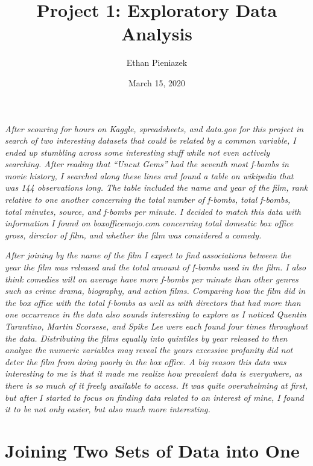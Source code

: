 \documentclass[]{article}
\title{Project 1: Exploratory Data Analysis}
\author{Ethan Pieniazek}
\date{March 15, 2020}
\begin{document}
\maketitle

\emph{After scouring for hours on Kaggle, spreadsheets, and data.gov for
this project in search of two interesting datasets that could be related
by a common variable, I ended up stumbling across some interesting stuff
while not even actively searching. After reading that ``Uncut Gems'' had
the seventh most f-bombs in movie history, I searched along these lines
and found a table on wikipedia that was 144 observations long. The table
included the name and year of the film, rank relative to one another
concerning the total number of f-bombs, total f-bombs, total minutes,
source, and f-bombs per minute. I decided to match this data with
information I found on boxofficemojo.com concerning total domestic box
office gross, director of film, and whether the film was considered a
comedy.}

\emph{After joining by the name of the film I expect to find
associations between the year the film was released and the total amount
of f-bombs used in the film. I also think comedies will on average have
more f-bombs per minute than other genres such as crime drama,
biography, and action films. Comparing how the film did in the box
office with the total f-bombs as well as with directors that had more
than one occurrence in the data also sounds interesting to explore as I
noticed Quentin Tarantino, Martin Scorsese, and Spike Lee were each
found four times throughout the data. Distributing the films equally
into quintiles by year released to then analyze the numeric variables
may reveal the years excessive profanity did not deter the film from
doing poorly in the box office. A big reason this data was interesting
to me is that it made me realize how prevalent data is everywhere, as
there is so much of it freely available to access. It was quite
overwhelming at first, but after I started to focus on finding data
related to an interest of mine, I found it to be not only easier, but
also much more interesting.}

\hypertarget{joining-two-sets-of-data-into-one}{%
\section{Joining Two Sets of Data into
One}\label{joining-two-sets-of-data-into-one}}
\end{document}

